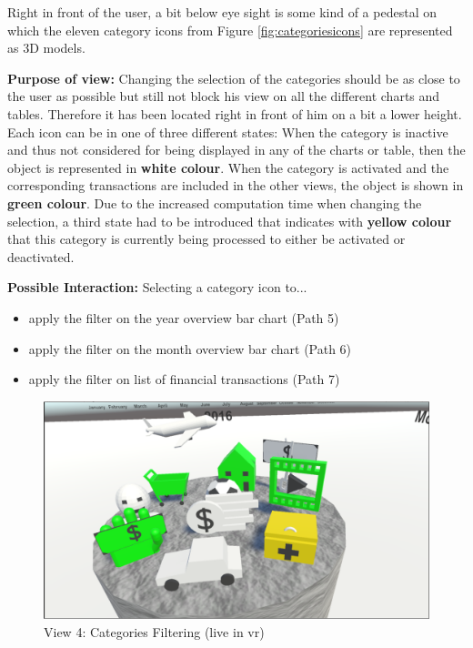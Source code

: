 Right in front of the user, a bit below eye sight is some kind of a pedestal on which the eleven category icons from Figure \ref{fig:categoriesicons} are represented as 3D models. 

\textbf{Purpose of view:} Changing the selection of the categories should be as close to the user as possible but still not block his view on all the different charts and tables. Therefore it has been located right in front of him on a bit a lower height. Each icon can be in one of three different states: When the category is inactive and thus not considered for being displayed in any of the charts or table, then the object is represented in \textbf{white colour}. When the category is activated and the corresponding transactions are included in the other views, the object is shown in \textbf{green colour}. Due to the increased computation time when changing the selection, a third state had to be introduced that indicates with \textbf{yellow colour} that this category is currently being processed to either be activated or deactivated.

\textbf{Possible Interaction:} Selecting a category icon to...
\begin{itemize}[noitemsep,nolistsep]
	\item apply the filter on the year overview bar chart (Path 5)
	\item apply the filter on the month overview bar chart (Path 6)
	\item apply the filter on list of financial transactions (Path 7)
\end{itemize}

\begin{figure}[h]
	\begin{center}
		\includegraphics[width=14cm]{03_Figures/08_Development/View4_CategoriesFiltering_Loading.png}
		\caption{View 4: Categories Filtering (live in \gls{vr})}
		\label{fig:unityview4}
	\end{center}
\end{figure}


